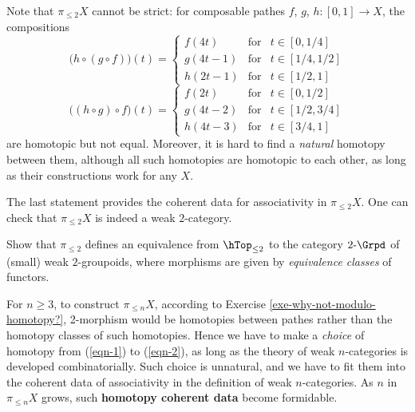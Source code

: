 Note that $\pi_{\le 2}X$ cannot be strict: for composable pathes $f$, $g$, $h:[0,1]\to X$, the compositions
\begin{equation}
	\label{eqn-1}
	\big(h\circ (g\circ f)\big) (t) = 
	\left\{ \begin{array}{rcl}
		f(4t) & \mbox{for} & t\in [0,1/4] \\
		g(4t-1) & \mbox{for} & t\in [1/4,1/2] \\
		h(2t-1) & \mbox{for} & t\in [1/2,1]
	\end{array}\right.
\end{equation}
\begin{equation}
	\label{eqn-2}
	\big( (h\circ g)\circ f\big) (t) = 
	\left\{ \begin{array}{rcl}
		f(2t) & \mbox{for} & t\in [0,1/2] \\
		g(4t-2) & \mbox{for} & t\in [1/2,3/4] \\
		h(4t-3) & \mbox{for} & t\in [3/4,1]
	\end{array}\right.
\end{equation}
are homotopic but not equal. Moreover, it is hard to find a \emph{natural} homotopy between them, although all such homotopies are homotopic to each other, as long as their constructions work for any $X$.

\medskip

The last statement provides the coherent data for associativity in $\pi_{\le 2}X$. One can check that $\pi_{\le 2}X$ is indeed a weak $2$-category.

\begin{cha}
	Show that $\pi_{\le 2}$ defines an equivalence from $\hTop_{\le 2}$ to the category $2\mbox{-}\Grpd$ of (small) weak $2$-groupoids, where morphisms are given by \emph{equivalence classes} of functors.
\end{cha}

\ssec{}

For $n\ge 3$, to construct $\pi_{\le n} X$, according to Exercise \ref{exe-why-not-modulo-homotopy?}, 2-morphism would be homotopies between pathes rather than the homotopy classes of such homotopies. Hence we have to make a \emph{choice} of homotopy from (\ref{eqn-1}) to (\ref{eqn-2}), as long as the theory of weak $n$-categories is developed combinatorially. Such choice is unnatural, and we have to fit them into the coherent data of associativity in the definition of weak $n$-categories. As $n$ in $\pi_{\le n}X$ grows, such \textbf{homotopy coherent data} become formidable.

\ssec{}

